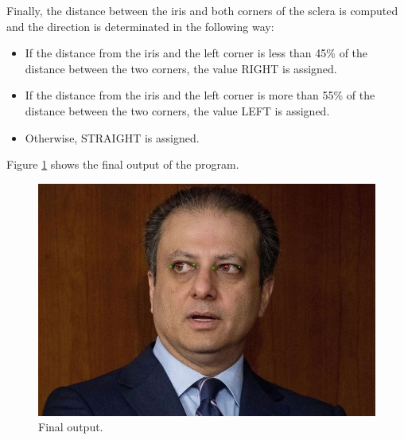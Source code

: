 \documentclass[14pt,a4paper]{extreport}
\begin{document}
Finally, the distance between the iris and both corners of the sclera is computed and the direction is determinated in the following way:

\begin{itemize}
	\item If the distance from the iris and the left corner is less than 45\% of the distance between the two corners, the value RIGHT is assigned.
	\item If the distance from the iris and the left corner is more than 55\% of the distance between the two corners, the value LEFT is assigned.
	\item Otherwise, STRAIGHT is assigned.
\end{itemize}

Figure \ref{fig:final} shows the final output of the program.

\begin{figure}[h]
\includegraphics[width=\linewidth, center]{images_T2S/5_final0.jpg} 
\caption{Final output.}
\label{fig:final}
\end{figure}
\end{document}
